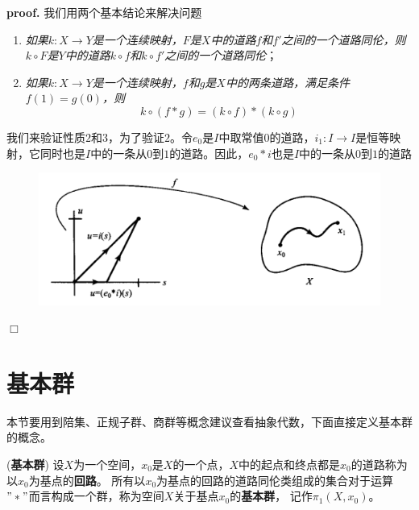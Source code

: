 \textbf{proof.} 我们用两个基本结论来解决问题
\begin{enumerate}[itemindent=2em]
    \item \textsl{如果$k:X\rightarrow Y$是一个连续映射，$F$是$X$中的道路$f$和$f'$之间的一个道路同伦，则$k\circ F$是$Y$中的道路$k\circ f$和$k\circ f'$之间的一个道路同伦}；
    \item \textsl{如果$k:X\rightarrow Y$是一个连续映射，$f$和$g$是$X$中的两条道路，满足条件$f(1)=g(0)$，则}
    \begin{equation}
        k\circ (f*g)=(k\circ f)*(k\circ g)
    \end{equation}
\end{enumerate}

我们来验证性质$2$和$3$，为了验证$2$。令$e_0$是$I$中取常值$0$的道路，$i_1:I\rightarrow I$是恒等映射，它同时也是$I$中的一条从$0$到$1$的道路。因此，$e_0*i$也是$I$中的一条从$0$到$1$的道路
\begin{figure}[H]
    \centering
    \includegraphics[scale=0.4]{figures/fig1.png}
    \caption{}
\end{figure}

$\Box$

\section{基本群}

本节要用到陪集、正规子群、商群等概念建议查看抽象代数，下面直接定义基本群的概念。
\vspace*{1em}

\begin{define}(\textbf{基本群})
    设$X$为一个空间，$x_0$是$X$的一个点，$X$中的起点和终点都是$x_0$的道路称为以$x_0$为基点的\textbf{回路}。
    所有以$x_0$为基点的回路的道路同伦类组成的集合对于运算$"*"$而言构成一个群，称为空间$X$关于基点$x_0$的\textbf{基本群}，
    记作$\pi_1(X,x_0)$。
\end{define}

\vspace*{1em}

